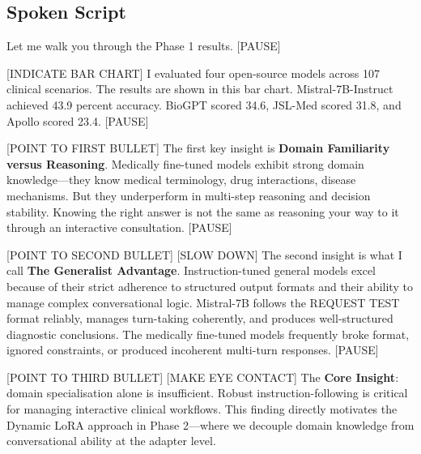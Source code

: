 \documentclass[12pt]{article}
\begin{document}
  \subsection*{Spoken Script}
  \begin{spokenbox}
   Let me walk you through the Phase 1 results. [PAUSE]

  [INDICATE BAR CHART] I evaluated four open-source models across 107 clinical scenarios. The results are shown in this bar chart. Mistral-7B-Instruct achieved 43.9 percent accuracy. BioGPT scored 34.6, JSL-Med scored 31.8, and Apollo scored 23.4. [PAUSE]

  [POINT TO FIRST BULLET] The first key insight is \textbf{Domain Familiarity versus Reasoning}. Medically fine-tuned models exhibit strong domain knowledge---they know medical terminology, drug interactions, disease mechanisms. But they underperform in multi-step reasoning and decision stability. Knowing the right answer is not the same as reasoning your way to it through an interactive consultation. [PAUSE]

  [POINT TO SECOND BULLET] [SLOW DOWN] The second insight is what I call \textbf{The Generalist Advantage}. Instruction-tuned general models excel because of their strict adherence to structured output formats and their ability to manage complex conversational logic. Mistral-7B follows the REQUEST TEST format reliably, manages turn-taking coherently, and produces well-structured diagnostic conclusions. The medically fine-tuned models frequently broke format, ignored constraints, or produced incoherent multi-turn responses. [PAUSE]

  [POINT TO THIRD BULLET] [MAKE EYE CONTACT] The \textbf{Core Insight}: domain specialisation alone is insufficient. Robust instruction-following is critical for managing interactive clinical workflows. This finding directly motivates the Dynamic LoRA approach in Phase 2---where we decouple domain knowledge from conversational ability at the adapter level.
  \end{spokenbox}
\end{document}
